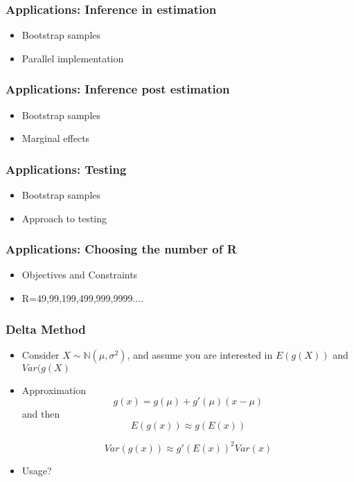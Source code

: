 \documentclass{beamer}
\newcommand{\1}{\mathbb{1}}
\newcommand{\N}{\mathbb{N}}
\begin{document}
\begin{frame}\frametitle{Applications: Inference in estimation}
\begin{itemize}
\item Bootstrap samples
\item Parallel implementation
\end{itemize}
\end{frame}

\begin{frame}\frametitle{Applications: Inference post estimation}
\begin{itemize}
\item Bootstrap samples
\item Marginal effects
\end{itemize}
\end{frame}

\begin{frame}\frametitle{Applications: Testing}
\begin{itemize}
\item Bootstrap samples
\item Approach to testing
\end{itemize}
\end{frame}

\begin{frame}\frametitle{Applications: Choosing the number of R}
\begin{itemize}
\item Objectives and Constraints
\item R=49,99,199,499,999,9999....
\end{itemize}
\end{frame}


\begin{frame}\frametitle{Delta Method}
\begin{itemize}
\item Consider $ X \sim \N(\mu,\sigma^2)$, and assume you are interested in $E(g(X))$ and $Var(g(X)$
\item Approximation 
\begin{equation}
g(x) = g(\mu) + g'(\mu)(x-\mu)
\end{equation}
and then
\begin{equation}
E(g(x)) \approx g(E(x))
\end{equation}

\begin{equation}
Var(g(x)) \approx g'(E(x))^2 Var(x)
\end{equation}
\item Usage?
\end{itemize}
\end{frame}
\end{document}
